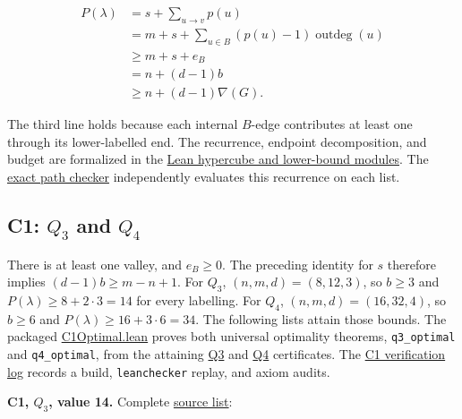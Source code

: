 \documentclass[11pt,a4paper]{article}
\begin{document}
\[
\begin{aligned}
P(\lambda)
&=s+\sum_{u\to v}p(u)\\
&=m+s+\sum_{u\in B}(p(u)-1)\operatorname{outdeg}(u)\\
&\ge m+s+e_B\\
&=n+(d-1)b\\
&\ge n+(d-1)\nabla(G).
\end{aligned}
\]

The third line holds because each internal \(B\)-edge contributes at least one through its lower-labelled end. The recurrence, endpoint decomposition, and budget are formalized in the \href{https://github.com/mpelteshki/climbing-to-the-frontier/blob/0680fde5d583d78c8a871bcf2bfae1028e16f117/cagent/p2/shared/DecyclingBridge.lean}{Lean hypercube and lower-bound modules}. The \href{https://github.com/mpelteshki/climbing-to-the-frontier/blob/0680fde5d583d78c8a871bcf2bfae1028e16f117/cagent/p2/shared/witnesses.py}{exact path checker} independently evaluates this recurrence on each list.

\subsection{\texorpdfstring{C1: \(Q_3\) and \(Q_4\)}{C1: Q\_3 and Q\_4}}\label{c1-q_3-and-q_4}

There is at least one valley, and \(e_B\ge0\). The preceding identity for \(s\) therefore implies \((d-1)b\ge m-n+1\). For \(Q_3\), \((n,m,d)=(8,12,3)\), so \(b\ge3\) and \(P(\lambda)\ge8+2\cdot3=14\) for every labelling. For \(Q_4\), \((n,m,d)=(16,32,4)\), so \(b\ge6\) and \(P(\lambda)\ge16+3\cdot6=34\). The following lists attain those bounds. The packaged \href{https://github.com/mpelteshki/climbing-to-the-frontier/blob/0680fde5d583d78c8a871bcf2bfae1028e16f117/cagent/p2/c1/C1Optimal.lean}{C1Optimal.lean} proves both universal optimality theorems, \texttt{q3\_optimal} and \texttt{q4\_optimal}, from the attaining \href{https://github.com/mpelteshki/climbing-to-the-frontier/blob/0680fde5d583d78c8a871bcf2bfae1028e16f117/cagent/p2/c1/Q3.lean}{Q3} and \href{https://github.com/mpelteshki/climbing-to-the-frontier/blob/0680fde5d583d78c8a871bcf2bfae1028e16f117/cagent/p2/c1/Q4.lean}{Q4} certificates. The \href{https://github.com/mpelteshki/climbing-to-the-frontier/blob/0680fde5d583d78c8a871bcf2bfae1028e16f117/cagent/p2/c1-optimality.log}{C1 verification log} records a build, \texttt{leanchecker} replay, and axiom audits.

\textbf{C1, \(Q_3\), value 14.} Complete \href{https://github.com/mpelteshki/climbing-to-the-frontier/blob/0680fde5d583d78c8a871bcf2bfae1028e16f117/cagent/p2/c1/q3-labels.txt}{source list}:
\end{document}
